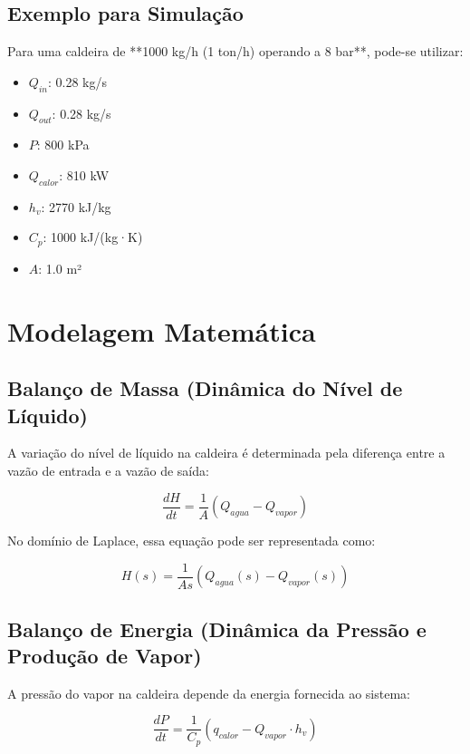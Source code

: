 \documentclass{article}
\begin{document}
\subsection{Exemplo para Simulação}
Para uma caldeira de **1000 kg/h (1 ton/h) operando a 8 bar**, pode-se utilizar:
\begin{itemize}
    \item \textbf{$Q_{in}$}: 0.28 kg/s
    \item \textbf{$Q_{out}$}: 0.28 kg/s
    \item \textbf{$P$}: 800 kPa
    \item \textbf{$Q_{calor}$}: 810 kW
    \item \textbf{$h_v$}: 2770 kJ/kg
    \item \textbf{$C_p$}: 1000 kJ/(kg·K)
    \item \textbf{$A$}: 1.0 m²
\end{itemize}

\section{Modelagem Matem\'atica}

\subsection{Balan\c{c}o de Massa (Din\^amica do N\'ivel de L\'iquido)}
A variação do nível de líquido na caldeira é determinada pela diferença entre a vazão de entrada e a vazão de saída:

\begin{equation}
    \frac{dH}{dt} = \frac{1}{A} (Q_{agua} - Q_{vapor})
\end{equation}

No domínio de Laplace, essa equação pode ser representada como:

\begin{equation}
    H(s) = \frac{1}{A s} (Q_{agua}(s) - Q_{vapor}(s))
\end{equation}

\subsection{Balan\c{c}o de Energia (Din\^amica da Press\~ao e Produ\c{c}\~ao de Vapor)}
A pressão do vapor na caldeira depende da energia fornecida ao sistema:

\begin{equation}
    \frac{dP}{dt} = \frac{1}{C_p} (q_{calor} - Q_{vapor} \cdot h_v)
\end{equation}
\end{document}

